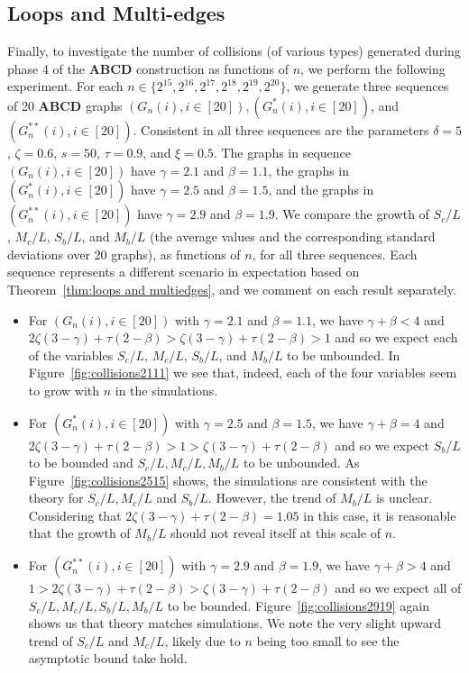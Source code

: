 \documentclass[12pt]{article}
\theoremstyle{definition}
\theoremstyle{remark}
\theoremstyle{remark}
\numberwithin{theorem}{section}
\begin{document}
\subsection{Loops and Multi-edges}
Finally, to investigate the number of collisions (of various types) generated during phase 4 of the \textbf{ABCD} construction as functions of $n$, we perform the following experiment. For each $n \in  \{2^{15},2^{16},2^{17},2^{18},2^{19},2^{20}\}$, we generate three sequences of 20 \textbf{ABCD} graphs $(G_n(i), i \in [20]), (G_n^*(i), i \in [20])$, and $(G_n^{**}(i), i \in [20])$. Consistent in all three sequences are the parameters $\delta = 5$, $\zeta = 0.6$, $s = 50$, $\tau = 0.9$, and $\xi = 0.5$. The graphs in sequence $(G_n(i), i \in [20])$ have $\gamma = 2.1$ and $\beta = 1.1$, the graphs in $(G_n^*(i), i \in [20])$ have $\gamma = 2.5$ and $\beta = 1.5$, and the graphs in $(G_n^{**}(i), i \in [20])$ have $\gamma = 2.9$ and $\beta = 1.9$. We compare the growth of $S_c/L$, $M_c/L$, $S_b/L$, and $M_b/L$ (the average values and the corresponding standard deviations over 20 graphs), as functions of $n$, for all three sequences. Each sequence represents a different scenario in expectation based on Theorem~\ref{thm:loops and multiedges}, and we comment on each result separately.
\begin{itemize}
\item For $(G_n(i), i \in [20])$ with $\gamma = 2.1$ and $\beta = 1.1$, we have $\gamma + \beta < 4$ and $2\zeta(3-\gamma) + \tau(2-\beta) > \zeta(3-\gamma) + \tau(2-\beta) > 1$ and so we expect each of the variables $S_c/L$, $M_c/L$, $S_b/L$, and $M_b/L$ to be unbounded. In Figure~\ref{fig:collisions2111} we see that, indeed, each of the four variables seem to grow with $n$ in the simulations. 
\item For $(G_n^*(i), i \in [20])$ with $\gamma = 2.5$ and $\beta = 1.5$, we have $\gamma + \beta = 4$ and $ 2\zeta(3-\gamma) + \tau(2-\beta) > 1 > \zeta(3-\gamma) + \tau(2-\beta)$ and so we expect $S_b/L$ to be bounded and $S_c/L,M_c/L,M_b/L$ to be unbounded. As Figure~\ref{fig:collisions2515} shows, the simulations are consistent with the theory for $S_c/L,M_c/L$ and $S_b/L$. However, the trend of $M_b/L$ is unclear. Considering that $2\zeta(3-\gamma) + \tau(2-\beta) = 1.05$ in this case, it is reasonable that the growth of $M_b/L$ should not reveal itself at this scale of $n$.
\item For $(G_n^{**}(i), i \in [20])$ with $\gamma = 2.9$ and $\beta = 1.9$, we have $\gamma + \beta > 4$ and $1 > 2\zeta(3-\gamma) + \tau(2-\beta) > \zeta(3-\gamma) + \tau(2-\beta)$ and so we expect all of $S_c/L,M_c/L,S_b/L,M_b/L$ to be bounded. Figure~\ref{fig:collisions2919} again shows us that theory matches simulations. We note the very slight upward trend of $S_c/L$ and $M_c/L$, likely due to $n$ being too small to see the asymptotic bound take hold.
\end{itemize}
\end{document}
